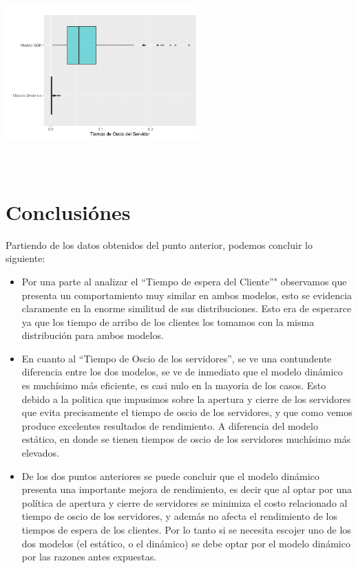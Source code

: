 \documentclass[]{article}
\begin{document}
\begin{center}\includegraphics[width=280px,height=280px]{sistema_dinamico_files/figure-latex/unnamed-chunk-21-1} \end{center}

\newpage

\section{Conclusiónes}\label{conclusiones}

Partiendo de los datos obtenidos del punto anterior, podemos concluir lo
siguiente:

\begin{itemize}
\item
  Por una parte al analizar el ``Tiempo de espera del Cliente''"
  observamos que presenta un comportamiento muy similar en ambos
  modelos, esto se evidencia claramente en la enorme similitud de sus
  distribuciones. Esto era de esperarce ya que los tiempo de arribo de
  los clientes los tomamos con la misma distribución para ambos modelos.
\item
  En cuanto al ``Tiempo de Oscio de los servidores'', se ve una
  contundente diferencia entre los dos modelos, se ve de inmediato que
  el modelo dinámico es muchísimo más eficiente, es casi nulo en la
  mayoria de los casos. Esto debido a la politica que impusimos sobre la
  apertura y cierre de los servidores que evita precisamente el tiempo
  de oscio de los servidores, y que como vemos produce excelentes
  resultados de rendimiento. A diferencia del modelo estático, en donde
  se tienen tiempos de oscio de los servidores muchísimo más elevados.
\item
  De los dos puntos anteriores se puede concluir que el modelo dinámico
  presenta una importante mejora de rendimiento, es decir que al optar
  por una política de apertura y cierre de servidores se minimiza el
  costo relacionado al tiempo de oscio de los servidores, y además no
  afecta el rendimiento de los tiempos de espera de los clientes. Por lo
  tanto si se necesita escojer uno de los dos modelos (el estático, o el
  dinámico) se debe optar por el modelo dinámico por las razones antes
  expuestas.
\end{itemize}
\end{document}
